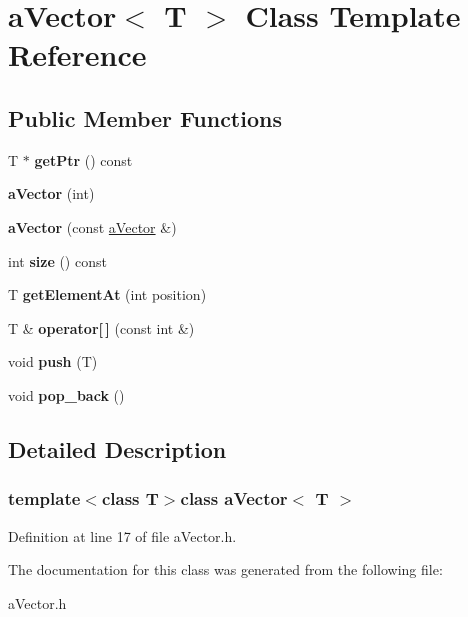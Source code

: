 \hypertarget{classa_vector}{}\section{a\+Vector$<$ T $>$ Class Template Reference}
\label{classa_vector}
\subsection*{Public Member Functions}
\begin{DoxyCompactItemize}
\item 
\hypertarget{classa_vector_a2903b82e85d5bc24963dfefdb0ed9e73}{}T $\ast$ {\bfseries get\+Ptr} () const \label{classa_vector_a2903b82e85d5bc24963dfefdb0ed9e73}

\item 
\hypertarget{classa_vector_ae885293ef6981bfa6e178e3c68ed07b5}{}{\bfseries a\+Vector} (int)\label{classa_vector_ae885293ef6981bfa6e178e3c68ed07b5}

\item 
\hypertarget{classa_vector_ae8d45fae76447576aae855ba8679d715}{}{\bfseries a\+Vector} (const \hyperlink{classa_vector}{a\+Vector} \&)\label{classa_vector_ae8d45fae76447576aae855ba8679d715}

\item 
\hypertarget{classa_vector_a569d9effb95afe393893286952df2917}{}int {\bfseries size} () const \label{classa_vector_a569d9effb95afe393893286952df2917}

\item 
\hypertarget{classa_vector_a946033581c2ff42da6dce83593f9208e}{}T {\bfseries get\+Element\+At} (int position)\label{classa_vector_a946033581c2ff42da6dce83593f9208e}

\item 
\hypertarget{classa_vector_ad92dd7c2b01aa47495a8d5b9525d80ca}{}T \& {\bfseries operator\mbox{[}$\,$\mbox{]}} (const int \&)\label{classa_vector_ad92dd7c2b01aa47495a8d5b9525d80ca}

\item 
\hypertarget{classa_vector_a087832909acac84b98425df67a9cc1af}{}void {\bfseries push} (T)\label{classa_vector_a087832909acac84b98425df67a9cc1af}

\item 
\hypertarget{classa_vector_a9a9c5df624e12007aa9283a0684c041f}{}void {\bfseries pop\+\_\+back} ()\label{classa_vector_a9a9c5df624e12007aa9283a0684c041f}

\end{DoxyCompactItemize}


\subsection{Detailed Description}
\subsubsection*{template$<$class T$>$class a\+Vector$<$ T $>$}



Definition at line 17 of file a\+Vector.\+h.



The documentation for this class was generated from the following file\+:\begin{DoxyCompactItemize}
\item 
a\+Vector.\+h\end{DoxyCompactItemize}
